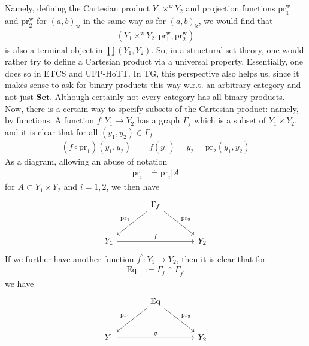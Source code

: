 Namely, defining the Cartesian product $Y_{1} \times^{\textrm{w}} Y_{2}$ and projection functions $\mathrm{pr}_{1}^{\textrm{w}}$ and $\mathrm{pr}_{2}^{\textrm{w}}$ for $(a,b)_{\textrm{w}}$ in the same way as for $(a,b)_{\textrm{k}}$, we would find that
\begin{align*}
  \left(
    Y_{1}
    \times^{\textrm{w}}
    Y_{2},
    \mathrm{pr}_{1}^{\textrm{w}},
    \mathrm{pr}_{2}^{\textrm{w}}
  \right)
\end{align*}
is also a terminal object in $\pmb{\prod}(Y_{1},Y_{2})$.
So, in a structural set theory, one would rather try to define a Cartesian product via a universal property.
Essentially, one does so in ETCS and UFP-HoTT.
In TG, this perspective also helps us, since it makes sense to ask for binary products this way w.r.t. an arbitrary category and not just $\mathbf{Set}$.
Although certainly not every category has all binary products.
\\
Now, there is a certain way to specify subsets of the Cartesian product: namely, by functions.
A function $f \colon Y_{1} \rightarrow Y_{2}$ has a graph $\Gamma_{f}$ which is a subset of $Y_{1} \times Y_{2}$, and it is clear that for all $(y_{1},y_{2}) \in \Gamma_{f}$
\begin{align*}
  \left(
    f
    \circ
    \mathrm{pr}_{1}
  \right)
  (y_{1},y_{2})
  &=
  f(y_{1})
  =
  y_{2}
  =
  \mathrm{pr}_{2}
  (y_{1},y_{2})
\end{align*}
As a diagram, allowing an abuse of notation
\begin{align*}
  \mathrm{pr}_{i}
  &\doteq
  \mathrm{pr}_{i} \vert A
\end{align*}
for $A \subset Y_{1} \times Y_{2}$ and $i=1,2$, we then have
\[
\begin{tikzcd}[sep=large]
  &
  \Gamma_{f}
  \arrow{dr}{\mathrm{pr}_{2}}
  \arrow[swap]{dl}{\mathrm{pr}_{1}}
  &
  \\
  Y_{1}
  \arrow{rr}{f}
  &
  &
  Y_{2}
\end{tikzcd}
\]
If we further have another function $f^{\backprime} \colon Y_{1} \rightarrow Y_{2}$, then it is clear that for
\begin{align*}
  \mathrm{Eq}
  &:=
  \Gamma_{f}
  \cap
  \Gamma_{f^{\backprime}}
\end{align*}
we have
\[
\begin{tikzcd}[sep=large]
  &
  \mathrm{Eq}
  \arrow{dr}{\mathrm{pr}_{2}}
  \arrow[swap]{dl}{\mathrm{pr}_{1}}
  &
  \\
  Y_{1}
  \arrow{rr}{g}
  &
  &
  Y_{2}
\end{tikzcd}
\]
